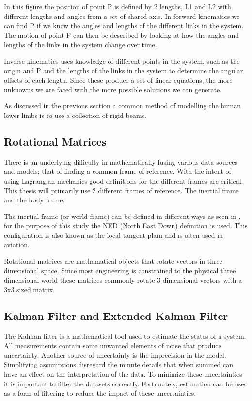 In this figure the position of point P is defined by 2 lengths, L1 and L2 with different lengths and angles from a set of shared axis. In forward kinematics we can find P if we know the angles and lengths of the different links in the system. The motion of point P can then be described by looking at  how the angles and lengths of the links in the system change over time.

Inverse kinematics uses knowledge of different points in the system, such as the origin and P and the lengths of the links in the system to determine the angular offsets of each length. Since these produce a set of linear equations, the more unknowns we are faced with the more possible solutions we can generate.

As discussed in the previous section a common method of modelling the human lower limbs is to use a collection of rigid beams. 


\subsection{Rotational Matrices}
There is an underlying difficulty in mathematically fusing various data sources and models; that of finding a common frame of reference. With the intent of using Lagrangian mechanics good definitions for the different frames are critical. This thesis will primarily use 2 different frames of reference. The inertial frame and the body frame.

The inertial frame (or world frame) can be defined in different ways as seen in \cite{soechting1992moving}, for the purpose of this study  the NED (North East Down) definition is used. This configuration is also known as the local tangent plain and is often used in aviation. 

Rotational matrices are mathematical objects that rotate vectors in three dimensional space. Since most engineering is constrained to the physical three dimensional world these matrices commonly rotate 3 dimensional vectors with a 3x3 sized matrix. 


\subsection{Kalman Filter and Extended Kalman Filter}
The Kalman filter is a mathematical tool used to estimate the states of a system. All measurements contain some unwanted elements of noise that produce uncertainty. Another source of uncertainty is the imprecision in the model. Simplifying assumptions disregard the minute details that when summed can have an effect on the interpretation of the data. To minimize these uncertainties it is important to filter the datasets correctly. Fortunately, estimation can be used as a form of filtering to reduce the impact of these uncertainties.    

